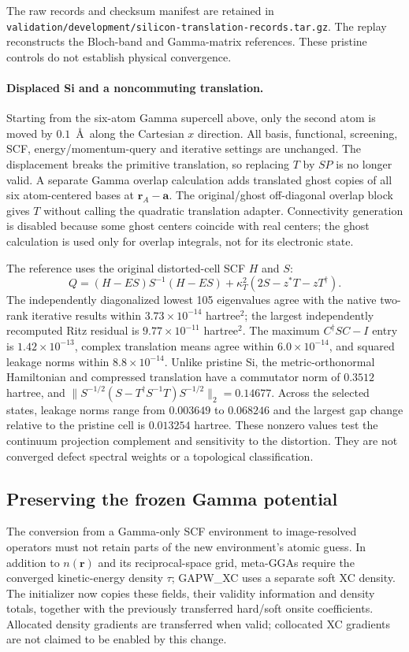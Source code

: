 \documentclass[11pt]{article}
\begin{document}
The raw records and checksum manifest are retained in
\nolinkurl{validation/development/silicon-translation-records.tar.gz}.
The replay reconstructs the Bloch-band and Gamma-matrix references.
These pristine controls do not establish physical convergence.

\paragraph{Displaced Si and a noncommuting translation.}
Starting from the six-atom Gamma supercell above, only the second
atom is moved by $0.1$~\AA\ along the Cartesian $x$ direction.
All basis, functional, screening, SCF, energy/momentum-query and
iterative settings are unchanged. The displacement breaks the
primitive translation, so replacing $T$ by $SP$ is no longer
valid. A separate Gamma overlap calculation adds translated ghost
copies of all six atom-centered bases at $\bm r_A-\bm a$.
The original/ghost off-diagonal overlap block gives $T$ without
calling the quadratic translation adapter. Connectivity generation
is disabled because some ghost centers coincide with real centers;
the ghost calculation is used only for overlap integrals, not
for its electronic state.

The reference uses the original distorted-cell SCF $H$ and $S$:
\begin{equation}
 Q=(H-ES)S^{-1}(H-ES)
       +\kappa_T^2(2S-z^*T-zT^\dagger).
\end{equation}
The independently diagonalized lowest 105 eigenvalues agree
with the native two-rank iterative results within
$3.73\times10^{-14}$ hartree$^2$; the largest independently
recomputed Ritz residual is $9.77\times10^{-11}$ hartree$^2$.
The maximum $C^\dagger SC-I$ entry is $1.42\times10^{-13}$,
complex translation means agree within $6.0\times10^{-14}$,
and squared leakage norms within $8.8\times10^{-14}$.
Unlike pristine Si, the metric-orthonormal Hamiltonian and
compressed translation have a commutator norm of
$0.3512$ hartree, and
$\|S^{-1/2}(S-T^\dagger S^{-1}T)S^{-1/2}\|_2=0.14677$.
Across the selected states, leakage norms range from
$0.003649$ to $0.068246$ and the largest gap change relative to
the pristine cell is $0.013254$ hartree. These nonzero values
test the continuum projection complement and sensitivity to the
distortion. They are not converged defect spectral weights or
a topological classification.

\subsection{Preserving the frozen Gamma potential}
\label{sec:si-frozen-density}
The conversion from a Gamma-only SCF environment to image-resolved
operators must not retain parts of the new environment's atomic
guess. In addition to $n(\bm r)$ and its reciprocal-space grid,
meta-GGAs require the converged kinetic-energy density $\tau$;
GAPW\_XC uses a separate soft XC density. The initializer now
copies these fields, their validity information and density
totals, together with the previously transferred hard/soft
onsite coefficients. Allocated density gradients are transferred
when valid; collocated XC gradients are not claimed to be enabled
by this change.
\end{document}
